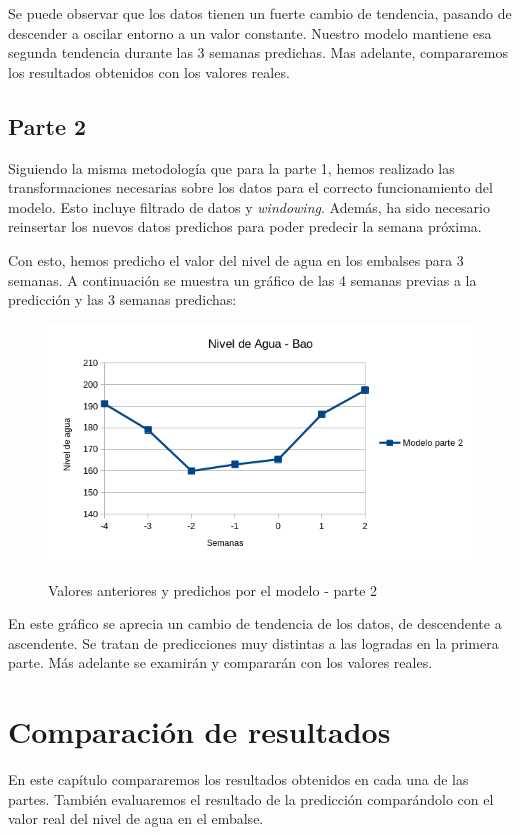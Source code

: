 \documentclass[12pt]{report} %
\begin{document}
Se puede observar que los datos tienen un fuerte cambio de tendencia, pasando de descender a oscilar entorno a un valor constante. Nuestro modelo mantiene esa segunda tendencia durante las 3 semanas predichas. Mas adelante, compararemos los resultados obtenidos con los valores reales.

\section{Parte 2}

Siguiendo la misma metodología que para la parte 1, hemos realizado las transformaciones necesarias sobre los datos para el correcto funcionamiento del modelo. Esto incluye filtrado de datos y \textit{windowing}. Además, ha sido necesario reinsertar los nuevos datos predichos para poder predecir la semana próxima.

Con esto, hemos predicho el valor del nivel de agua en los embalses para 3 semanas. A continuación se muestra un gráfico de las 4 semanas previas a la predicción y las 3 semanas predichas:

\begin{figure}[H]
    \includegraphics[width=0.85\linewidth]{predict-2-bao.png}\\
    \caption{\small Valores anteriores y  predichos por el modelo - parte 2}
\end{figure}

En este gráfico se aprecia un cambio de tendencia de los datos, de descendente a ascendente. Se tratan de predicciones muy distintas a las logradas en la primera parte. Más adelante se examirán y compararán con los valores reales.

\chapter{Comparación de resultados}
\label{chap:result-comparing}
En este capítulo compararemos los resultados obtenidos en cada una de las partes. También evaluaremos el resultado de la predicción comparándolo con el valor real del nivel de agua en el embalse.
\end{document}
